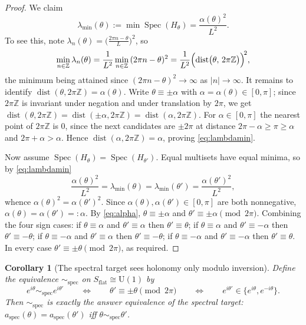 \documentclass[11pt,reqno]{amsart}
\theoremstyle{plain}
\newtheorem{corollary}[theorem]{Corollary}
\theoremstyle{definition}
\newcommand{\Zz}{\mathbb{Z}}
\newcommand{\Uone}{\mathrm{U}(1)}
\newcommand{\Src}{S}
\newcommand{\Spec}{\operatorname{Spec}}
\begin{document}
\begin{proof}
We claim
\begin{equation}\label{eq:lambdamin}
\lambda_{\min}(\theta):=\min\Spec(H_\theta)=\frac{\alpha(\theta)^2}{L^2}.
\end{equation}
To see this, note $\lambda_n(\theta)=\bigl(\tfrac{2\pi n-\theta}{L}\bigr)^2$, so
\begin{equation*}
\min_{n\in\Zz}\lambda_n(\theta)
=\frac{1}{L^2}\min_{n\in\Zz}\,(2\pi n-\theta)^2
=\frac{1}{L^2}\Bigl(\operatorname{dist}\bigl(\theta,\,2\pi\Zz\bigr)\Bigr)^{\!2},
\end{equation*}
the minimum being attained since $(2\pi n-\theta)^2\to\infty$ as $|n|\to\infty$. It remains to
identify $\operatorname{dist}(\theta,2\pi\Zz)=\alpha(\theta)$. Write $\theta\equiv\pm\alpha$ with
$\alpha=\alpha(\theta)\in[0,\pi]$; since $2\pi\Zz$ is invariant under negation and under
translation by $2\pi$, we get
$\operatorname{dist}(\theta,2\pi\Zz)=\operatorname{dist}(\pm\alpha,2\pi\Zz)
=\operatorname{dist}(\alpha,2\pi\Zz)$. For $\alpha\in[0,\pi]$ the nearest point of $2\pi\Zz$ is
$0$, since the next candidates are $\pm2\pi$ at distance $2\pi-\alpha\ge\pi\ge\alpha$ and
$2\pi+\alpha>\alpha$. Hence $\operatorname{dist}(\alpha,2\pi\Zz)=\alpha$, proving
\eqref{eq:lambdamin}.

Now assume $\Spec(H_\theta)=\Spec(H_{\theta'})$. Equal multisets have equal minima, so by
\eqref{eq:lambdamin}
\begin{equation*}
\frac{\alpha(\theta)^2}{L^2}=\lambda_{\min}(\theta)=\lambda_{\min}(\theta')
=\frac{\alpha(\theta')^2}{L^2},
\end{equation*}
whence $\alpha(\theta)^2=\alpha(\theta')^2$. Since $\alpha(\theta),\alpha(\theta')\in[0,\pi]$ are
both nonnegative, $\alpha(\theta)=\alpha(\theta')=:\alpha$. By \eqref{eq:alpha},
$\theta\equiv\pm\alpha$ and $\theta'\equiv\pm\alpha\pmod{2\pi}$. Combining the four sign cases:
if $\theta\equiv\alpha$ and $\theta'\equiv\alpha$ then $\theta'\equiv\theta$; if
$\theta\equiv\alpha$ and $\theta'\equiv-\alpha$ then $\theta'\equiv-\theta$; if
$\theta\equiv-\alpha$ and $\theta'\equiv\alpha$ then $\theta'\equiv-\theta$; if
$\theta\equiv-\alpha$ and $\theta'\equiv-\alpha$ then $\theta'\equiv\theta$. In every case
$\theta'\equiv\pm\theta\pmod{2\pi}$, as required.
\end{proof}

\begin{corollary}[The spectral target sees holonomy only modulo inversion]\label{cor:inversion}
Define the equivalence $\sim_{\mathrm{spec}}$ on $\Src_{\mathrm{flat}}\cong\Uone$ by
\begin{equation}\label{eq:spec-equiv}
e^{i\theta}\sim_{\mathrm{spec}}e^{i\theta'}
\qquad\Longleftrightarrow\qquad
\theta'\equiv\pm\theta\pmod{2\pi}
\qquad\Longleftrightarrow\qquad
e^{i\theta'}\in\{e^{i\theta},e^{-i\theta}\}.
\end{equation}
Then $\sim_{\mathrm{spec}}$ is exactly the answer equivalence of the spectral target:
$a_{\mathrm{spec}}(\theta)=a_{\mathrm{spec}}(\theta')$ iff $\theta\sim_{\mathrm{spec}}\theta'$.
\end{corollary}
\end{document}
